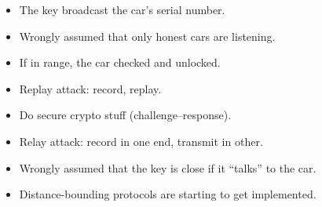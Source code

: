 \begin{frame}
  \begin{example}
    \begin{itemize}
      \item The key broadcast the car's serial number.
      \item Wrongly assumed that only honest cars are listening.
      \item If in range, the car checked and unlocked.
    \end{itemize}
  \end{example}

  \pause

  \begin{remark}
    \begin{itemize}
      \item Replay attack: record, replay.
    \end{itemize}
  \end{remark}
\end{frame}

\begin{frame}
  \begin{example}
    \begin{itemize}
      \item Do secure crypto stuff (challenge--response).
    \end{itemize}
  \end{example}

  \pause

  \begin{remark}
    \begin{itemize}
      \item Relay attack: record in one end, transmit in other.
      \item Wrongly assumed that the key is close if it \enquote{talks} to the 
        car.
      \item Distance-bounding protocols are starting to get implemented.
    \end{itemize}
  \end{remark}
\end{frame}



\begin{frame}
	\small
  \printbibliography
\end{frame}

